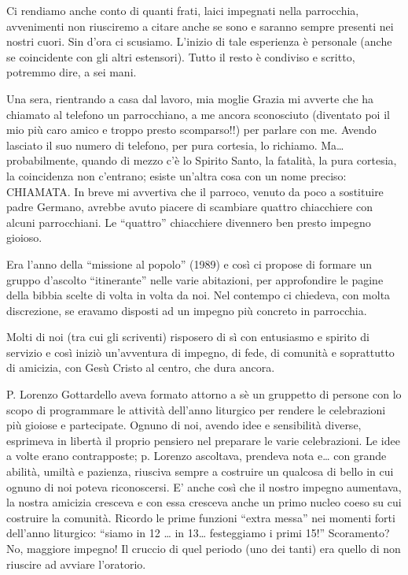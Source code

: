 Ci rendiamo anche conto di quanti frati, laici impegnati nella parrocchia, avvenimenti non 
riusciremo a citare anche se sono e saranno sempre presenti nei nostri cuori. Sin d’ora ci scusiamo.
L’inizio di tale esperienza è personale (anche se coincidente con gli altri estensori). Tutto il resto è 
condiviso e scritto, potremmo dire, a sei mani.

Una sera, rientrando a casa dal lavoro, mia moglie Grazia mi avverte che ha chiamato al 
telefono un parrocchiano, a me ancora sconosciuto (diventato poi il mio più caro amico e troppo 
presto scomparso!!) per parlare con me. Avendo lasciato il suo numero di telefono, per pura 
cortesia, lo richiamo. Ma…probabilmente, quando di mezzo c’è lo Spirito Santo, la fatalità, la pura 
cortesia, la coincidenza non c’entrano; esiste un’altra cosa con un nome preciso: CHIAMATA.
In breve mi avvertiva che il parroco, venuto da poco a sostituire padre Germano, avrebbe avuto 
piacere di scambiare quattro chiacchiere con alcuni parrocchiani. Le “quattro” chiacchiere 
divennero ben presto impegno gioioso.

Era l’anno della “missione al popolo” (1989) e così ci propose di formare un gruppo d’ascolto 
“itinerante” nelle varie abitazioni, per approfondire le pagine della bibbia scelte di volta in volta da 
noi. Nel contempo ci chiedeva, con molta discrezione, se eravamo disposti ad un impegno più 
concreto in parrocchia.

Molti di noi (tra cui gli scriventi) risposero di sì con entusiasmo e spirito di servizio e così iniziò 
un’avventura di impegno, di fede, di comunità e soprattutto di amicizia, con Gesù Cristo al centro, 
che dura ancora.

P. Lorenzo Gottardello aveva formato attorno a sè un gruppetto di persone con lo scopo di 
programmare le attività dell’anno liturgico per rendere le celebrazioni più gioiose e partecipate. 
Ognuno di noi, avendo idee e sensibilità diverse, esprimeva in libertà il proprio pensiero nel 
preparare le varie celebrazioni. Le idee a volte erano contrapposte; p. Lorenzo ascoltava, prendeva 
nota e… con grande abilità, umiltà e pazienza, riusciva sempre a costruire un qualcosa di bello in 
cui ognuno di noi poteva riconoscersi. E’ anche così che il nostro impegno aumentava, la nostra 
amicizia cresceva e con essa cresceva anche un primo nucleo coeso su cui costruire la comunità. 
Ricordo le prime funzioni “extra messa” nei momenti forti dell’anno liturgico: “siamo in 12 … in 
13… festeggiamo i primi 15!” Scoramento? No, maggiore impegno!
Il cruccio di quel periodo (uno dei tanti) era quello di non riuscire ad avviare l’oratorio.

